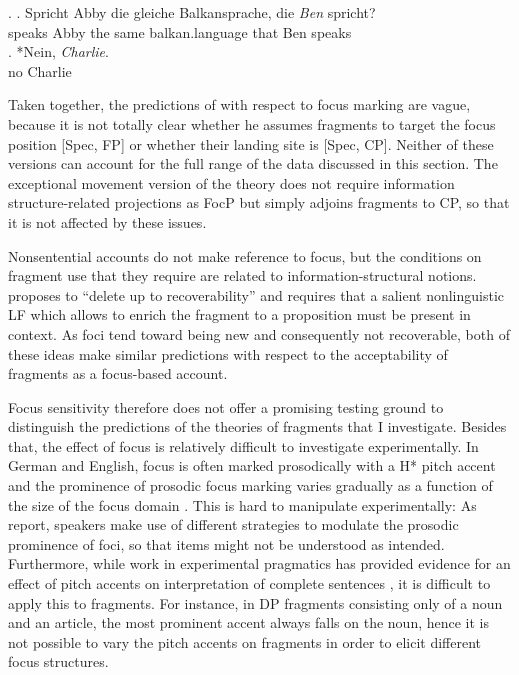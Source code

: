 \ex. \ag. Spricht Abby die gleiche Balkansprache, die \textit{Ben} spricht?\\
	  speaks Abby the same balkan.language that Ben speaks\\
\bg. *Nein, \textit{Charlie}.\label{ex:merchant-island-ger-shortanswer}\\
      no Charlie\\

Taken together, the predictions of \citet{merchant2004} with respect to focus marking are vague, because it is not totally clear whether he assumes fragments to target the focus position [Spec, FP] or whether their landing site is [Spec, CP]. Neither of these versions can account for the full range of the data discussed in this section. The exceptional movement version of the theory \citep{weir2014} does not require information structure-related projections as FocP but simply adjoins fragments to CP, so that it is not affected by these issues.\largerpage

Nonsentential accounts do not make reference to focus, but the conditions on fragment use that they require are related to information-structural notions. \citet{barton1990} proposes to ``delete up to recoverability'' and \citet{stainton2006} requires that a salient nonlinguistic LF which allows to enrich the fragment to a proposition must be present in context. As foci tend toward being new and consequently not recoverable, both of these ideas make similar predictions with respect to the acceptability of fragments as a focus-based account.

Focus sensitivity therefore does not offer a promising testing ground to distinguish the predictions of the theories of fragments that I investigate. Besides that, the effect of focus is relatively difficult to investigate experimentally. In German and English, focus is often marked prosodically with a H* pitch accent \citep{gussenhoven1983, pierrehumbert.hirschberg1990} and the prominence of prosodic focus marking varies gradually as a function of the size of the focus domain \citet{baumann.etal2006, baumann.etal2007}. This is hard to manipulate experimentally: As \citet{baumann.etal2007} report, speakers make use of different strategies to modulate the prosodic prominence of foci, so that items might not be understood as intended. Furthermore, while work in experimental pragmatics has provided evidence for an effect of pitch accents on interpretation of complete sentences \citep[see e.g.][]{chevallier.etal2008, zondervan2010}, it is difficult to apply this to fragments. For instance, in DP fragments consisting only of a noun and an article, the most prominent accent always falls on the noun, hence it is not possible to vary the pitch accents on fragments in order to elicit different focus structures.


